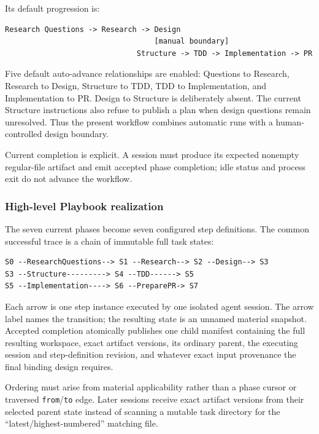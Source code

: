 \documentclass[11pt]{article}
\begin{document}
Its default progression is:

\begin{lstlisting}[style=playbook]
Research Questions -> Research -> Design
                                  [manual boundary]
                              Structure -> TDD -> Implementation -> PR
\end{lstlisting}

Five default auto-advance relationships are enabled: Questions to Research, Research to Design, Structure to TDD, TDD to Implementation, and Implementation to PR. Design to Structure is deliberately absent. The current Structure instructions also refuse to publish a plan when design questions remain unresolved. Thus the present workflow combines automatic runs with a human-controlled design boundary.

Current completion is explicit. A session must produce its expected nonempty regular-file artifact and emit accepted phase completion; idle status and process exit do not advance the workflow.

\subsubsection{High-level Playbook realization}

The seven current phases become seven configured step definitions. The common successful trace is a chain of immutable full task states:

\begin{lstlisting}[style=playbook]
S0 --ResearchQuestions--> S1 --Research--> S2 --Design--> S3
S3 --Structure---------> S4 --TDD------> S5
S5 --Implementation----> S6 --PreparePR-> S7
\end{lstlisting}

Each arrow is one step instance executed by one isolated agent session. The arrow label names the transition; the resulting state is an unnamed material snapshot. Accepted completion atomically publishes one child manifest containing the full resulting workspace, exact artifact versions, its ordinary parent, the executing session and step-definition revision, and whatever exact input provenance the final binding design requires.

Ordering must arise from material applicability rather than a phase cursor or traversed \texttt{from}/\texttt{to} edge. Later sessions receive exact artifact versions from their selected parent state instead of scanning a mutable task directory for the ``latest/highest-numbered'' matching file.
\end{document}
